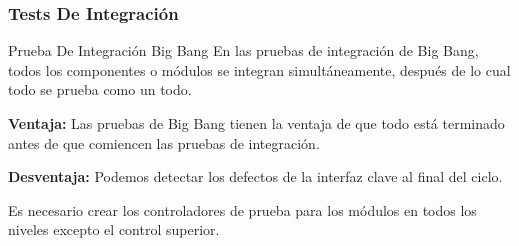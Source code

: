 \begin{frame}
    \frametitle{Tests De Integración}

    \begin{block}{Prueba De Integración Big Bang}
        En las pruebas de integración de Big Bang, todos los componentes o 
        módulos se integran simultáneamente, después de lo cual todo se 
        prueba como un todo.
        
        \textbf{Ventaja:} Las pruebas de Big Bang tienen la ventaja de que 
        todo está terminado antes de que comiencen las pruebas de integración.
        
        \textbf{Desventaja:} Podemos detectar los defectos de la interfaz 
        clave al final del ciclo.

        Es necesario crear los controladores de prueba para los módulos 
        en todos los niveles excepto el control superior.
    \end{block}
\end{frame}


